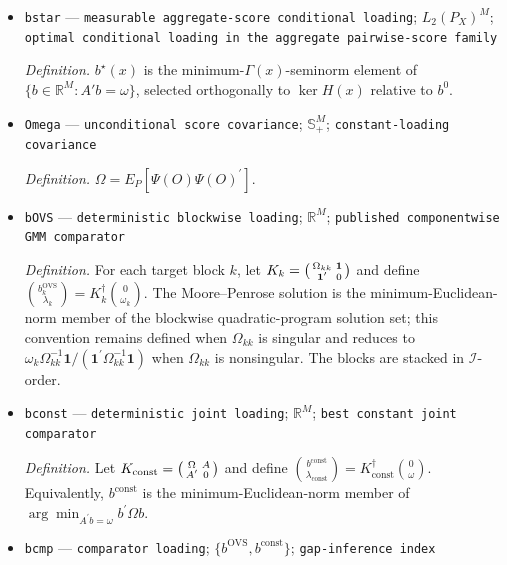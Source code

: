 \documentclass{article}
\begin{document}
\begin{itemize}
  \par\smallskip\noindent\emph{Definition.} \(b^{0}=A(A^{\prime}A)^{-1}\omega\), so \(A^{\prime}b^{0}=\omega\).
  \item \texttt{bstar} --- \texttt{measurable aggregate-\allowbreak{}score conditional loading}; \(L_2(P_X)^M\); \texttt{optimal conditional loading in the aggregate pairwise-\allowbreak{}score family}
  \par\smallskip\noindent\emph{Definition.} \(b^{\star}(x)\) is the minimum-\(\Gamma(x)\)-seminorm element of \(\{b\in\mathbb R^M:A'b=\omega\}\), selected orthogonally to \(\ker H(x)\) relative to \(b^0\).
  \item \texttt{Omega} --- \texttt{unconditional score covariance}; \(\mathbb S_+^M\); \texttt{constant-\allowbreak{}loading covariance}
  \par\smallskip\noindent\emph{Definition.} \(\Omega=E_P[\Psi(O)\Psi(O)^{\prime}]\).
  \item \texttt{bOVS} --- \texttt{deterministic blockwise loading}; \(\mathbb R^M\); \texttt{published componentwise GMM comparator}
  \par\smallskip\noindent\emph{Definition.} For each target block \(k\), let \(K_k=\begin{psmallmatrix}\Omega_{kk}&\mathbf 1\\\mathbf 1^{\prime}&0\end{psmallmatrix}\) and define \(\binom{b^{\mathrm{OVS}}_k}{\lambda_k}=K_k^{\dagger}\binom{0}{\omega_k}\). The Moore--Penrose solution is the minimum-Euclidean-norm member of the blockwise quadratic-program solution set; this convention remains defined when \(\Omega_{kk}\) is singular and reduces to \(\omega_k\Omega_{kk}^{-1}\mathbf 1/(\mathbf 1^{\prime}\Omega_{kk}^{-1}\mathbf 1)\) when \(\Omega_{kk}\) is nonsingular. The blocks are stacked in \(\mathcal I\)-order.
  \item \texttt{bconst} --- \texttt{deterministic joint loading}; \(\mathbb R^M\); \texttt{best constant joint comparator}
  \par\smallskip\noindent\emph{Definition.} Let \(K_{\mathrm{const}}=\begin{psmallmatrix}\Omega&A\\A^{\prime}&0\end{psmallmatrix}\) and define \(\binom{b^{\mathrm{const}}}{\lambda_{\mathrm{const}}}=K_{\mathrm{const}}^{\dagger}\binom{0}{\omega}\). Equivalently, \(b^{\mathrm{const}}\) is the minimum-Euclidean-norm member of \(\arg\min_{A^{\prime}b=\omega}b^{\prime}\Omega b\).
  \item \texttt{bcmp} --- \texttt{comparator loading}; \(\{b^{\mathrm{OVS}},b^{\mathrm{const}}\}\); \texttt{gap-\allowbreak{}inference index}

\end{itemize}
\end{document}

